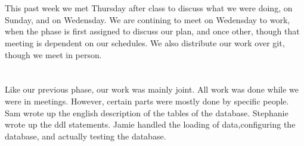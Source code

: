 \documentclass{article}
\begin{document}
\section{}




\section{}
This past week we met Thursday after class to discuss what we were doing, on
Sunday, and on Wedensday. We are contining to meet on Wedensday to work, when
the phase is first assigned to discuss our plan, and once other, though that
meeting is dependent on our schedules. We also distribute our work over git,
though we meet in person.

\section{}
Like our previous phase, our work was mainly joint. All work was done while we
were in meetings. However, certain parts were mostly done by specific people.
Sam wrote up the english description of the tables of the database. Stephanie
wrote up the ddl statements. Jamie handled the loading of data,configuring the
database, and actually testing the database.
\end{document}
